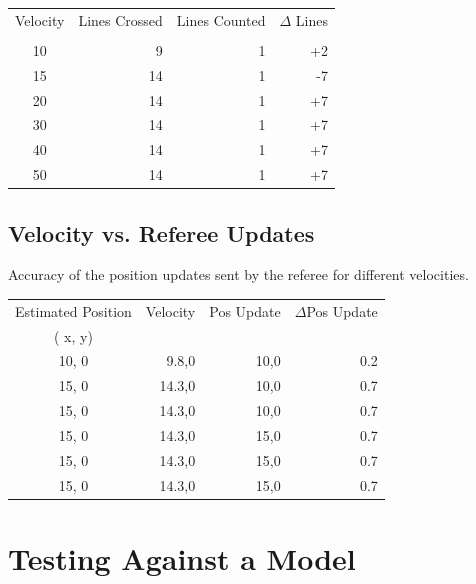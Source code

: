 \documentclass[12pt]{article}
\begin{document}
\begin{tabular}{ | c || r | r | r | }
\hline
Velocity & Lines Crossed & Lines Counted & $\Delta$ Lines \\
 & & &  \\ \hline
10 & 9 & 1 & +2  \\ \hline
15 & 14 & 1 & -7  \\ \hline
20 & 14 & 1 & +7  \\ \hline
30  & 14 & 1 & +7  \\ \hline
40 & 14 & 1 & +7  \\ \hline
50 & 14 & 1 & +7  \\ \hline
\end{tabular}

\subsection*{Velocity vs. Referee Updates}
Accuracy of the position updates sent by the referee for different velocities.


\begin{tabular}{ | c || r | r | r | }
\hline
Estimated Position & Velocity & Pos Update &  $\Delta$Pos Update \\
 ( x, y) & & &  \\ \hline
10, 0 & 9.8,0 & 10,0 & 0.2  \\ \hline
15, 0 & 14.3,0 & 10,0 & 0.7 \\ \hline
15, 0 & 14.3,0 & 10,0 & 0.7 \\ \hline
15, 0 & 14.3,0 & 15,0 & 0.7 \\ \hline
15, 0 & 14.3,0 & 15,0 & 0.7 \\ \hline
15, 0 & 14.3,0 & 15,0 & 0.7 \\ \hline
\end{tabular}

\section*{Testing Against a Model}
\end{document}
